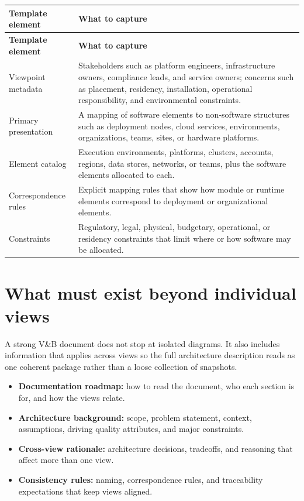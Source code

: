 \documentclass[11pt]{article}
\begin{document}
\begin{longtable}{@{}P{0.26\textwidth}P{0.69\textwidth}@{}}
\textbf{Template element} & \textbf{What to capture} \\
\toprule
\endfirsthead
{}
\textbf{Template element} & \textbf{What to capture} \\
\toprule
\endhead
Viewpoint metadata & Stakeholders such as platform engineers, infrastructure owners, compliance leads, and service owners; concerns such as placement, residency, installation, operational responsibility, and environmental constraints. \\
Primary presentation & A mapping of software elements to non-software structures such as deployment nodes, cloud services, environments, organizations, teams, sites, or hardware platforms. \\
Element catalog & Execution environments, platforms, clusters, accounts, regions, data stores, networks, or teams, plus the software elements allocated to each. \\
Correspondence rules & Explicit mapping rules that show how module or runtime elements correspond to deployment or organizational elements. \\
Constraints & Regulatory, legal, physical, budgetary, operational, or residency constraints that limit where or how software may be allocated. \\
\bottomrule
\end{longtable}

\section{What must exist beyond individual views}

A strong V\&B document does not stop at isolated diagrams. It also includes information that applies across views so the full architecture description reads as one coherent package rather than a loose collection of snapshots.

\begin{itemize}[leftmargin=1.5em]
    \item \textbf{Documentation roadmap:} how to read the document, who each section is for, and how the views relate.
    \item \textbf{Architecture background:} scope, problem statement, context, assumptions, driving quality attributes, and major constraints.
    \item \textbf{Cross-view rationale:} architecture decisions, tradeoffs, and reasoning that affect more than one view.
    \item \textbf{Consistency rules:} naming, correspondence rules, and traceability expectations that keep views aligned.
\end{itemize}
\end{document}
